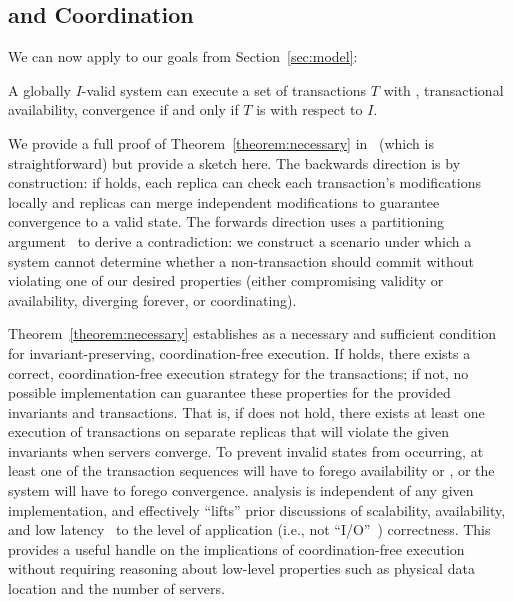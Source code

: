 \subsection{\iconfluence and Coordination}
\label{sec:ic-result}

We can now apply \iconfluence to our goals from Section~\ref{sec:model}:

\begin{theorem}
\label{theorem:necessary}
A globally $I$-valid system can execute a set of transactions $T$ with
\cfreedom, transactional availability, convergence if and only if $T$
is \iconfluent with respect to $I$.
\end{theorem}

We provide a full proof of Theorem~\ref{theorem:necessary}
in~\rappendix{\apptheory} (which is straightforward) but provide a
sketch here. The backwards direction is by construction: if
\iconfluence holds, each replica can check each transaction's
modifications locally and replicas can merge independent modifications
to guarantee convergence to a valid state. The forwards direction uses
a partitioning argument~\cite{gilbert-cap} to derive a contradiction:
we construct a scenario under which a system cannot determine whether
a non-\iconfluent transaction should commit without violating one of
our desired properties (either compromising validity or availability,
diverging forever, or coordinating).

Theorem~\ref{theorem:necessary} establishes \iconfluence as a
necessary and sufficient condition for invariant-preserving,
coordination-free execution.  If \iconfluence holds, there exists a
correct, coordination-free execution strategy for the transactions; if
not, no possible implementation can guarantee these properties for the
provided invariants and transactions. That is, if \iconfluence does
not hold, there exists at least one execution of transactions on
separate replicas that will violate the given invariants when servers
converge. To prevent invalid states from occurring, at least one of
the transaction sequences will have to forego availability or
\cfreedom, or the system will have to forego convergence. \iconfluence
analysis is independent of any given implementation, and effectively
``lifts'' prior discussions of scalability, availability, and low
latency~\cite{hat-vldb,gilbert-cap,pacelc} to the level of application
(i.e., not ``I/O''~\cite{consistency-borders}) correctness. This
provides a useful handle on the implications of coordination-free
execution without requiring reasoning about low-level properties such
as physical data location and the number of servers.

